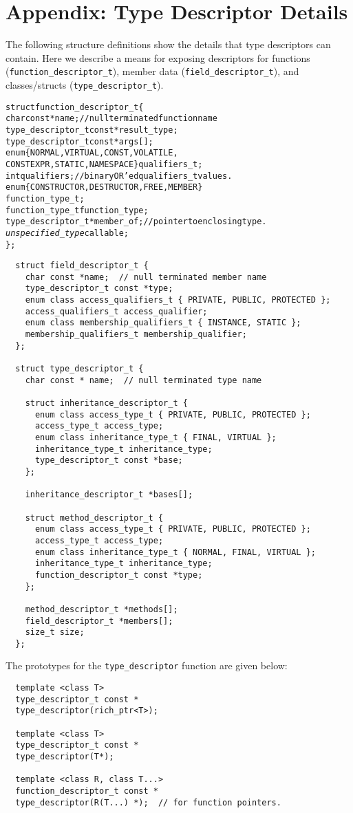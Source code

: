\section{Appendix: Type Descriptor Details}
\label{appendix:type-descriptors-appendix}
The following structure definitions show the details that type descriptors can
contain. Here we describe a means for exposing descriptors for functions
(\verb+function_descriptor_t+), member data (\verb+field_descriptor_t+), and
classes/structs (\verb+type_descriptor_t+).

\begin{alltt}
  struct function\_descriptor\_t \{
    char const *name;  // null terminated function name
    type\_descriptor\_t const *result\_type;
    type\_descriptor\_t const *args[];
    enum \{ NORMAL, VIRTUAL, CONST, VOLATILE,
           CONSTEXPR, STATIC, NAMESPACE \} qualifiers\_t;
    int qualifiers;  // binary OR’ed qualifiers\_t values.
    enum \{ CONSTRUCTOR, DESTRUCTOR, FREE, MEMBER \}
    function\_type\_t;
    function\_type\_t function\_type;
    type\_descriptor\_t *member\_of;  // pointer to enclosing type.
    \emph{unspecified\_type} callable;
  \};
\end{alltt}
\begin{verbatim}
  struct field_descriptor_t {
    char const *name;  // null terminated member name
    type_descriptor_t const *type;
    enum class access_qualifiers_t { PRIVATE, PUBLIC, PROTECTED };
    access_qualifiers_t access_qualifier;
    enum class membership_qualifiers_t { INSTANCE, STATIC };
    membership_qualifiers_t membership_qualifier;
  };

  struct type_descriptor_t {
    char const * name;  // null terminated type name

    struct inheritance_descriptor_t {
      enum class access_type_t { PRIVATE, PUBLIC, PROTECTED };
      access_type_t access_type;
      enum class inheritance_type_t { FINAL, VIRTUAL };
      inheritance_type_t inheritance_type;
      type_descriptor_t const *base;
    };

    inheritance_descriptor_t *bases[];

    struct method_descriptor_t {
      enum class access_type_t { PRIVATE, PUBLIC, PROTECTED };
      access_type_t access_type;
      enum class inheritance_type_t { NORMAL, FINAL, VIRTUAL };
      inheritance_type_t inheritance_type;
      function_descriptor_t const *type;
    };

    method_descriptor_t *methods[];
    field_descriptor_t *members[];
    size_t size;
  };
\end{verbatim}

The prototypes for the \verb+type_descriptor+ function are given below:

\begin{verbatim}
  template <class T>
  type_descriptor_t const *
  type_descriptor(rich_ptr<T>);

  template <class T>
  type_descriptor_t const *
  type_descriptor(T*);

  template <class R, class T...>
  function_descriptor_t const *
  type_descriptor(R(T...) *);  // for function pointers.
\end{verbatim}


